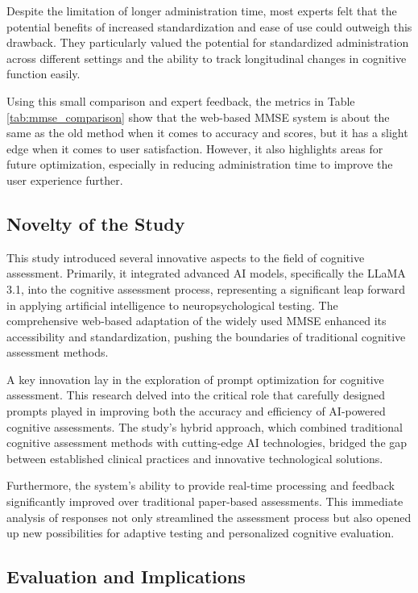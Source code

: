 Despite the limitation of longer administration time, most experts felt that the potential benefits of increased standardization and ease of use could outweigh this drawback. They particularly valued the potential for standardized administration across different settings and the ability to track longitudinal changes in cognitive function easily.

Using this small comparison and expert feedback, the metrics in Table \ref{tab:mmse_comparison} show that the web-based MMSE system is about the same as the old method when it comes to accuracy and scores, but it has a slight edge when it comes to user satisfaction. However, it also highlights areas for future optimization, especially in reducing administration time to improve the user experience further.

\subsection{Novelty of the Study}

This study introduced several innovative aspects to the field of cognitive assessment. Primarily, it integrated advanced AI models, specifically the LLaMA 3.1, into the cognitive assessment process, representing a significant leap forward in applying artificial intelligence to neuropsychological testing. The comprehensive web-based adaptation of the widely used MMSE enhanced its accessibility and standardization, pushing the boundaries of traditional cognitive assessment methods.

A key innovation lay in the exploration of prompt optimization for cognitive assessment. This research delved into the critical role that carefully designed prompts played in improving both the accuracy and efficiency of AI-powered cognitive assessments. The study's hybrid approach, which combined traditional cognitive assessment methods with cutting-edge AI technologies, bridged the gap between established clinical practices and innovative technological solutions.

Furthermore, the system's ability to provide real-time processing and feedback significantly improved over traditional paper-based assessments. This immediate analysis of responses not only streamlined the assessment process but also opened up new possibilities for adaptive testing and personalized cognitive evaluation.

\subsection{Evaluation and Implications}

